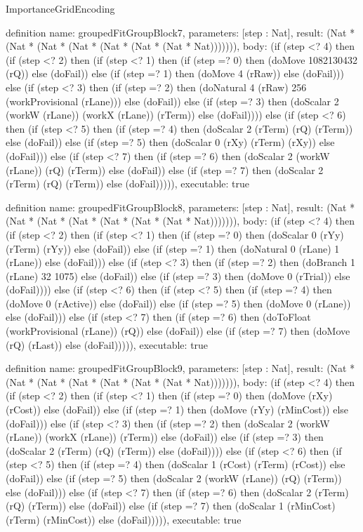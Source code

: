 \begin{lexlean}{ImportanceGridEncoding}
\begin{semanticmodule}
definition{
  name: groupedFitGroupBlock7,
  parameters: [step : Nat],
  result: (Nat * (Nat * (Nat * (Nat * (Nat * (Nat * (Nat * Nat))))))),
  body: (if (step <? 4) then
      (if (step <? 2) then
      (if (step <? 1) then
      (if (step =? 0) then (doMove 1082130432 (rQ)) else (doFail)) else
      (if (step =? 1) then (doMove 4 (rRaw)) else (doFail))) else
      (if (step <? 3) then
      (if (step =? 2) then (doNatural 4 (rRaw) 256 (workProvisional (rLane))) else (doFail)) else
      (if (step =? 3) then (doScalar 2 (workW (rLane)) (workX (rLane)) (rTerm)) else (doFail)))) else
      (if (step <? 6) then
      (if (step <? 5) then
      (if (step =? 4) then (doScalar 2 (rTerm) (rQ) (rTerm)) else (doFail)) else
      (if (step =? 5) then (doScalar 0 (rXy) (rTerm) (rXy)) else (doFail))) else
      (if (step <? 7) then
      (if (step =? 6) then (doScalar 2 (workW (rLane)) (rQ) (rTerm)) else (doFail)) else
      (if (step =? 7) then (doScalar 2 (rTerm) (rQ) (rTerm)) else (doFail))))),
  executable: true
}

definition{
  name: groupedFitGroupBlock8,
  parameters: [step : Nat],
  result: (Nat * (Nat * (Nat * (Nat * (Nat * (Nat * (Nat * Nat))))))),
  body: (if (step <? 4) then
      (if (step <? 2) then
      (if (step <? 1) then
      (if (step =? 0) then (doScalar 0 (rYy) (rTerm) (rYy)) else (doFail)) else
      (if (step =? 1) then (doNatural 0 (rLane) 1 (rLane)) else (doFail))) else
      (if (step <? 3) then
      (if (step =? 2) then (doBranch 1 (rLane) 32 1075) else (doFail)) else
      (if (step =? 3) then (doMove 0 (rTrial)) else (doFail)))) else
      (if (step <? 6) then
      (if (step <? 5) then
      (if (step =? 4) then (doMove 0 (rActive)) else (doFail)) else
      (if (step =? 5) then (doMove 0 (rLane)) else (doFail))) else
      (if (step <? 7) then
      (if (step =? 6) then (doToFloat (workProvisional (rLane)) (rQ)) else (doFail)) else
      (if (step =? 7) then (doMove (rQ) (rLast)) else (doFail))))),
  executable: true
}

definition{
  name: groupedFitGroupBlock9,
  parameters: [step : Nat],
  result: (Nat * (Nat * (Nat * (Nat * (Nat * (Nat * (Nat * Nat))))))),
  body: (if (step <? 4) then
      (if (step <? 2) then
      (if (step <? 1) then
      (if (step =? 0) then (doMove (rXy) (rCost)) else (doFail)) else
      (if (step =? 1) then (doMove (rYy) (rMinCost)) else (doFail))) else
      (if (step <? 3) then
      (if (step =? 2) then (doScalar 2 (workW (rLane)) (workX (rLane)) (rTerm)) else (doFail)) else
      (if (step =? 3) then (doScalar 2 (rTerm) (rQ) (rTerm)) else (doFail)))) else
      (if (step <? 6) then
      (if (step <? 5) then
      (if (step =? 4) then (doScalar 1 (rCost) (rTerm) (rCost)) else (doFail)) else
      (if (step =? 5) then (doScalar 2 (workW (rLane)) (rQ) (rTerm)) else (doFail))) else
      (if (step <? 7) then
      (if (step =? 6) then (doScalar 2 (rTerm) (rQ) (rTerm)) else (doFail)) else
      (if (step =? 7) then (doScalar 1 (rMinCost) (rTerm) (rMinCost)) else (doFail))))),
  executable: true
}


\end{semanticmodule}
\end{lexlean}
